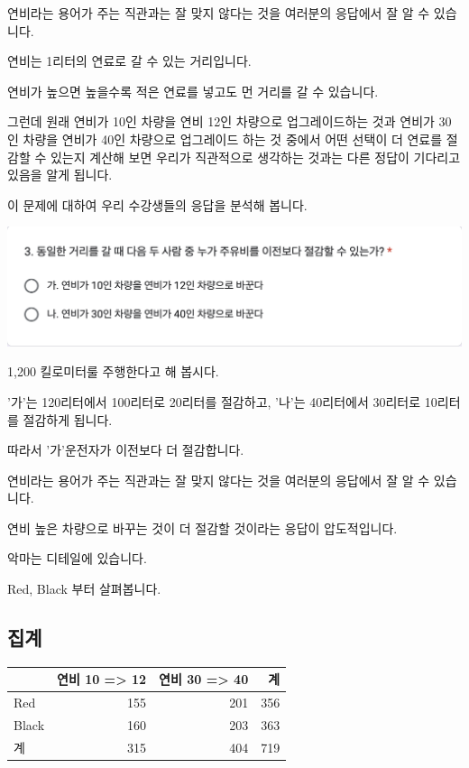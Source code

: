\documentclass[
]{book}
\begin{document}
연비라는 용어가 주는 직관과는 잘 맞지 않다는 것을 여러분의 응답에서 잘 알 수 있습니다.

연비는 1리터의 연료로 갈 수 있는 거리입니다.

연비가 높으면 높을수록 적은 연료를 넣고도 먼 거리를 갈 수 있습니다.

그런데 원래 연비가 10인 차량을 연비 12인 차량으로 업그레이드하는 것과 연비가 30인 차량을 연비가 40인 차량으로 업그레이드 하는 것 중에서 어떤 선택이 더 연료를 절감할 수 있는지 계산해 보면 우리가 직관적으로 생각하는 것과는 다른 정답이 기다리고 있음을 알게 됩니다.

이 문제에 대하여 우리 수강생들의 응답을 분석해 봅니다.

\includegraphics[width=0.75\linewidth]{./pics/Quiz240524_Q3}

1,200 킬로미터룰 주행한다고 해 봅시다.

'가'는 120리터에서 100리터로 20리터를 절감하고, '나'는 40리터에서 30리터로 10리터를 절감하게 됩니다.

따라서 '가'운전자가 이전보다 더 절감합니다.

연비라는 용어가 주는 직관과는 잘 맞지 않다는 것을 여러분의 응답에서 잘 알 수 있습니다.

연비 높은 차량으로 바꾸는 것이 더 절감할 것이라는 응답이 압도적입니다.

악마는 디테일에 있습니다.

Red, Black 부터 살펴봅니다.

\subsection{집계}\label{uxc9d1uxacc4-38}

\begin{tabular}{l|r|r|r}
\hline
  & 연비 10 => 12 & 연비 30 => 40 & 계\\
\hline
Red & 155 & 201 & 356\\
\hline
Black & 160 & 203 & 363\\
\hline
계 & 315 & 404 & 719\\
\hline
\end{tabular}
\end{document}
